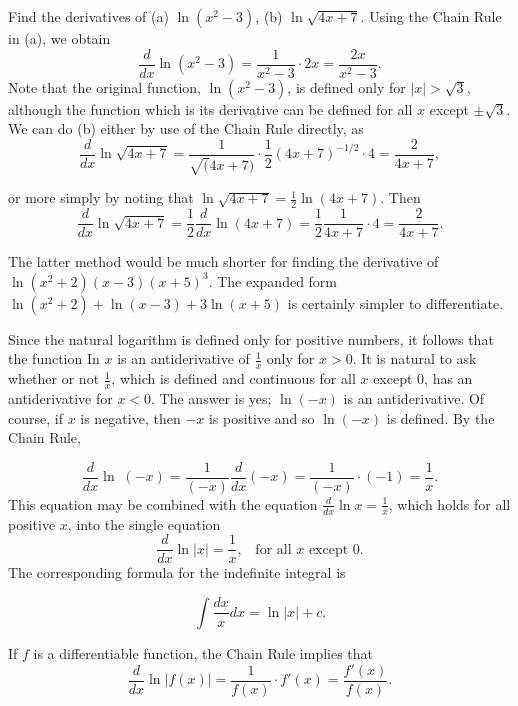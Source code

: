 \begin{example}
Find the derivatives of (a) $\ln (x^2 - 3)$, (b) $\ln \sqrt{4x + 7}$. Using the Chain Rule in (a), we obtain
$$
\frac{d}{dx} \ln(x^2 - 3) = \frac{1}{x^2 - 3} \cdot 2x = \frac{2x}{x^2 - 3}.
$$
\noindent Note that the original function, $\ln (x^2 - 3)$, is defined only for $|x| > \sqrt{3}$, although the function which is its derivative can be defined for all $x$ except $\pm \sqrt{3}$. We can do (b) either by use of the Chain Rule directly, as
$$
\frac{d}{dx} \ln \sqrt{4x + 7}  = \frac{1}{\sqrt (4x + 7)} \cdot \frac{1}{2} (4x + 7)^{-1/2} \cdot 4 = \frac{2}{4x + 7},
$$

\noindent or more simply by noting that $\ln \sqrt{4x + 7} = \frac{1}{2} \ln(4x + 7)$. Then
$$
\frac{d}{dx} \ln \sqrt{4x + 7} = \frac{1}{2} \frac{d}{dx} \ln(4x + 7) = \frac{1}{2} \frac{1}{4x + 7} \cdot 4 = \frac{2}{4x + 7}.
$$

\noindent The latter method would be much shorter for finding the derivative of $\ln(x^2 + 2)(x - 3)(x + 5)^3$. The expanded form $\ln (x^2 + 2) + \ln (x - 3) + 3 \ln (x + 5)$ is certainly simpler to differentiate.
\end{example}
\medskip

Since the natural logarithm is defined only for positive numbers, it follows that the function In $x$ is an antiderivative of $\frac{1}{x}$ only for $x > 0$. It is natural to ask whether or not $\frac{1}{x}$, which is defined and continuous for all $x$ except 0, has an antiderivative for $x < 0$. The answer is yes; $\ln (-x)$ is an antiderivative. Of course, if $x$ is negative, then $-x$ is positive and so $\ln (-x)$ is defined. By the Chain Rule,

$$
\frac{d}{dx} \ln\;(-x) = \frac{1}{(-x)} \frac{d}{dx} (-x) = \frac{1}{(-x)} \cdot  (-1) = \frac{1}{x} .
$$
This equation may be combined with the equation $\frac{d}{dx} \ln x = \frac{1}{x}$, which holds for all positive $x$, into the single equation  
$$
\frac{d}{dx} \ln |x| = \frac{1}{x}, \;\;\;\mbox{for all $x$ except 0}.
$$
\noindent The corresponding formula for the indefinite integral is 

\begin{theorem}
$$
\int \frac{dx}{x} dx = \ln | x | +  c.
$$
\end{theorem}

If $f$ is a differentiable function, the Chain Rule implies that
$$
\frac{d}{dx} \ln | f(x) | = \frac{1}{f(x)} \cdot  f'(x) = \frac{f'(x)}{f(x)}.
$$

